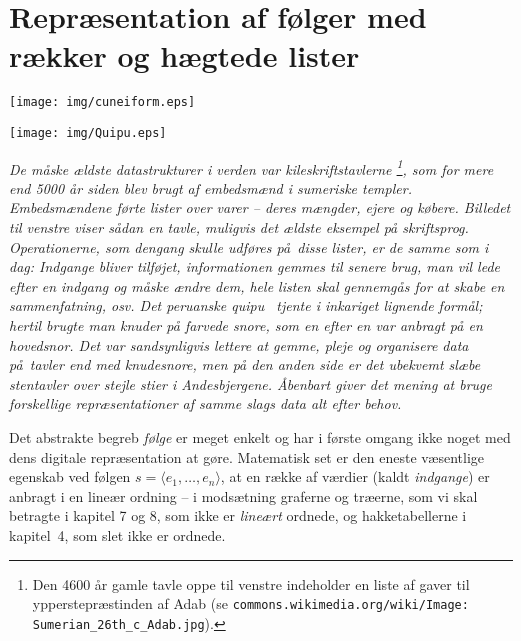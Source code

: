 \chapter{Repræsentation af følger med rækker og hægtede lister}
\renewcommand{\labelprefix}{ch:sequence}
\llabel{}

\vspace*{-2.5cm}
\begin{minipage}{0.5\textwidth}
\begin{flushleft}
  \texttt{[image: img/cuneiform.eps]}
\end{flushleft}
\end{minipage}
\begin{minipage}{0.5\textwidth}
\begin{flushright}
\texttt{[image: img/Quipu.eps]} 
\end{flushright}
\end{minipage}
\vspace*{0.5cm}

\noindent
\emph{De måske ældste datastrukturer i verden var kileskriftstavlerne%
\footnote{%
Den 4600 år gamle tavle oppe til venstre indeholder en liste af gaver til ypperstepræstinden af Adab (se \texttt{commons.wikimedia.org/wiki/Image: Sumerian\_26th\_c\_Adab.jpg}).
},
som for mere end 5000 år siden blev brugt af embedsmænd i sumeriske templer.
Embedsmændene førte lister over varer -- deres mængder, ejere og købere.
Billedet til venstre viser sådan en tavle, muligvis det ældste eksempel på skriftsprog.
Operationerne, som dengang skulle udføres på disse lister, er de samme som i dag:
Indgange bliver tilføjet, informationen gemmes til senere brug, man vil lede efter en indgang og  måske ændre dem, hele listen skal gennemgås for at skabe en sammenfatning, osv.
Det peruanske quipu~\cite{cuipi} tjente i inkariget lignende formål;
hertil brugte man knuder på farvede snore, som en efter en var anbragt på en hovedsnor.
Det var sandsynligvis lettere at gemme, pleje og organisere data på tavler end med knudesnore, men på den anden side er det ubekvemt slæbe stentavler over stejle stier i Andesbjergene.
Åbenbart giver det mening at bruge forskellige repræsentationer af samme slags data alt efter behov.
}

\bigskip\noindent
Det abstrakte begreb \emph{følge} er meget enkelt og har i første omgang ikke noget med dens digitale repræsentation at gøre.
Matematisk set er den eneste væsentlige egenskab ved følgen $s = \langle e_1,\ldots, e_n\rangle$, at en række af værdier (kaldt \emph{indgange}) er anbragt i en lineær ordning -- i modsætning graferne og træerne, som vi skal betragte i kapitel 7 og 8, som ikke er \emph{lineært} ordnede, og hakketabellerne i kapitel~4, som slet ikke er ordnede.

